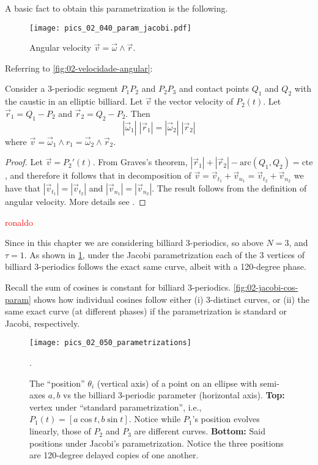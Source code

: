 
A basic fact to obtain this parametrization is the following.

\begin{figure}
    \centering
    \texttt{[image: pics\_02\_040\_param\_jacobi.pdf]}
    \caption{ Angular velocity $\vec v=\vec \omega\wedge \vec r$. } 
    \end{figure}
Referring to \cref{fig:02-velocidade-angular}:

\begin{proposition} 
Consider a 3-periodic segment $P_1P_2$ and $P_2P_3$  and contact points $Q_1$ and $Q_2$ with the caustic in an elliptic billiard. Let $\vec v$ the vector velocity of $P_2(t)$. Let $\vec r_1=Q_1-P_2$ and $\vec r_2=Q_2-P_2$. Then
\[ |\vec \omega_1|\;|\vec r_1|=|\vec \omega_2|\; |\vec r_2|\]
where $\vec v=\vec\omega_1\wedge r_1= \vec\omega_2\wedge \vec r_2$.

\label{fig:02-velocidade-angular}
\end{proposition}

\begin{proof} Let $\vec v=P_2'(t)$. From Graves's theorem, $|\vec r_1|+|\vec r_2|-\text{arc}(Q_1,Q_2)=\text{cte}$,  and therefore it follows that in decomposition of $\vec v=\vec v_{t_1}+\vec v_{n_1}=\vec v_{t_2}+\vec v_{n_2}$ we have that $|\vec v_{t_1}|=|\vec v_{t_2}|$ and  $|\vec v_{n_1}|=|\vec v_{n_2}|$. The result follows from the   definition of angular velocity. More details see \cite{stachel2021-billiards-param}.
\end{proof}
 
\textcolor{red}{ronaldo}
 
Since in this chapter we are considering billiard 3-periodics, so above $N=3$, and $\tau=1$. As shown in \cref{fig:02-jacobi-param}, under the Jacobi parametrization each of the 3 vertices of billiard 3-periodics follows the exact same curve, albeit with a 120-degree phase.

Recall the sum of cosines is constant for billiard 3-periodics. \cref{fig:02-jacobi-cos-param} shows how individual cosines follow either (i) 3-distinct curves, or (ii) the same exact curve (at different phases) if the parametrization is standard or Jacobi, respectively.

\begin{figure}
    \centering
    \texttt{[image: pics\_02\_050\_parametrizations]}
    \caption{The ``position'' $\theta_i$ (vertical axis) of a point on an ellipse with semi-axes $a,b$ vs the billiard 3-periodic parameter (horizontal axis). \textbf{Top:} vertex  under ``standard parametrization'', i.e., $P_1(t)=[a\cos{t},b\sin{t}]$. Notice while $P_1$'s position evolves linearly, those of $P_2$ and $P_3$ are different curves. \textbf{Bottom:} Said positions under Jacobi's parametrization. Notice the three positions are 120-degree delayed copies of one another.}. 
    \label{fig:02-jacobi-param}
\end{figure}

